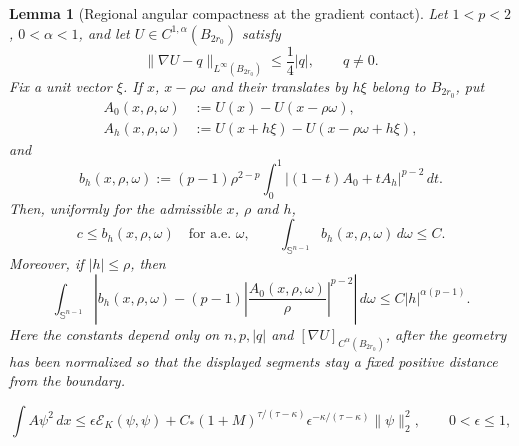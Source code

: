 \documentclass[10pt,a4paper]{amsart}
\newtheorem{lemma}{Lemma}
\newcommand{\dd}{\,d}
\begin{document}
\begin{lemma}[Regional angular compactness at the gradient contact]
\label{lem:regional-angular-compactness}
Let $1<p<2$, $0<\alpha<1$, and let $U\in C^{1,\alpha}(B_{2r_0})$ satisfy
\begin{equation}
 \|\nabla U-q\|_{L^\infty(B_{2r_0})}\le\frac14|q|,
 \qquad q\ne0.
 \label{eq:noncritical-gradient-tube}
\end{equation}
Fix a unit vector $\xi$.  If $x$, $x-\rho\omega$ and their translates by
$h\xi$ belong to $B_{2r_0}$, put
\begin{align*}
 A_0(x,\rho,\omega)&:=U(x)-U(x-\rho\omega),\\
 A_h(x,\rho,\omega)&:=U(x+h\xi)-U(x-\rho\omega+h\xi),
\end{align*}
and
\begin{equation*}
 b_h(x,\rho,\omega)
 :=(p-1)\rho^{2-p}\int_0^1
 |(1-t)A_0+tA_h|^{p-2}\dd t.
\end{equation*}
Then, uniformly for the admissible $x$, $\rho$ and $h$,
\begin{equation}
 c\le b_h(x,\rho,\omega)\quad\text{for a.e. }\omega,
 \qquad
 \int_{\mathbb S^{n-1}}b_h(x,\rho,\omega)\dd\omega\le C.
 \label{eq:regional-angular-ellipticity}
\end{equation}
Moreover, if $|h|\le\rho$, then
\begin{equation}
 \int_{\mathbb S^{n-1}}
 \left|b_h(x,\rho,\omega)
 -(p-1)\left|\frac{A_0(x,\rho,\omega)}{\rho}\right|^{p-2}
 \right|\dd\omega
 \le C|h|^{\alpha(p-1)}.
 \label{eq:regional-angular-convergence}
\end{equation}
Here the constants depend only on $n,p,|q|$ and
$[\nabla U]_{C^\alpha(B_{2r_0})}$, after the geometry has been normalized
so that the displayed segments stay a fixed positive distance from the
boundary.
\end{lemma}

\begin{equation}
 \int A\psi^2\dd x
 \le \epsilon\mathcal E_K(\psi,\psi)
 +C_*(1+M)^{\tau/(\tau-\kappa)}
       \epsilon^{-\kappa/(\tau-\kappa)}\|\psi\|_2^2,
 \qquad 0<\epsilon\le1,
 \label{eq:kato-infinitesimal-form-bound}
\end{equation}
\end{document}
